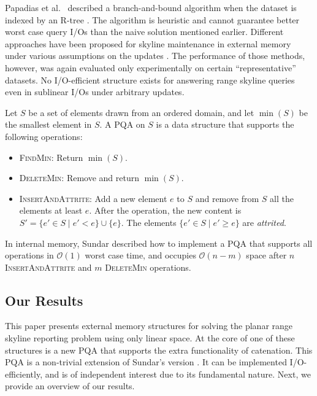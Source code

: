 \documentclass{sig-alternate}
\def\extraspacing{\vspace{2mm} \noindent}
\newcommand{\bigO}{\mathcal{O}}
\renewcommand{\(}{\left(}
\renewcommand{\)}{\right)}
\begin{document}
Papadias et al.\ \cite{PTFS05} described a branch-and-bound algorithm when the
dataset is indexed by an R-tree \cite{G84}. The algorithm is heuristic and
cannot guarantee better worst case query I/Os than the naive solution mentioned
earlier. Different approaches have been proposed for skyline maintenance in
external memory under various assumptions on the updates
\cite{TP06,WAEA07,PTFS05,HLOT06}. The performance of those methods, however,
was again evaluated only experimentally on certain ``representative'' datasets.
No I/O-efficient structure exists for answering range skyline queries even in
sublinear I/Os under arbitrary updates.

\extraspacing {\bf Priority Queues with Attrition (PQAs).} Let $S$ be a set of elements drawn from an ordered domain, and let $\min(S)$ be the smallest element in $S$.
A PQA on $S$ is a data structure that supports the following operations:
\begin{itemize}
	\item \textsc{FindMin}: Return $\min(S)$. \vspace{-2mm}

	\item \textsc{DeleteMin}: Remove and return $\min(S)$. \vspace{-2mm}

	\item \textsc{InsertAndAttrite}: Add a new element $e$ to $S$ and remove from $S$ all the elements at least $e$.
	After the operation, the new content is $S'=\{e' \in S \mid e' < e\} \cup \{e\}$.
    The elements $\{e' \in S \mid e' \ge e\}$ are {\em attrited}.
\end{itemize}
In internal memory, Sundar \cite{S89} described how to implement a PQA that supports all operations in $\bigO(1)$ worst case time, and occupies $\bigO(n-m)$ space after $n$ \textsc{InsertAndAttrite} and $m$ \textsc{DeleteMin} operations.

\subsection{Our Results} \label{sec:intro-ours}

This paper presents external memory structures for solving the planar range skyline reporting problem using only linear space. At the core of one of these structures is a new PQA that supports the extra functionality of catenation. This PQA is a non-trivial extension of Sundar's version \cite{S89}. It can be implemented I/O-efficiently, and is of independent interest due to its fundamental nature. Next, we provide an overview of our results.
\end{document}
